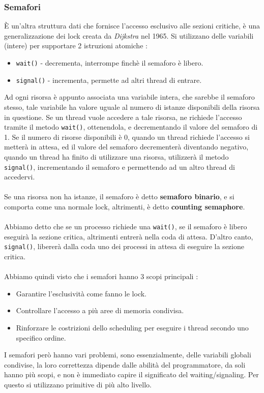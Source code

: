 \documentclass[12pt, letterpaper]{article}
\newcommand{\code}[1]{\colorbox{light-gray}{\texttt{#1}}}
\newcommand{\acc}{\\\hphantom{}\\}
\begin{document}
\subsubsection{Semafori}
È un'altra struttura dati che fornisce l'accesso esclusivo alle sezioni critiche, è una generalizzazione dei lock 
creata da \textit{Dijkstra} nel 1965. Si utilizzano delle variabili (intere) per supportare 2 
istruzioni atomiche :\begin{itemize}
    \item \code{wait()} - decrementa, interrompe finchè il semaforo è libero. 
    \item \code{signal()}  - incrementa, permette ad altri thread di entrare. 
\end{itemize}
Ad ogni risorsa è appunto associata una variabile intera, che sarebbe il semaforo stesso, tale variabile ha valore uguale al numero di 
istanze disponibili della risorsa in questione. Se un thread vuole accedere a tale risorsa, ne richiede l'accesso tramite il metodo 
\code{wait()}, ottenendola, e decrementando il valore del semaforo di 1. Se il numero di risorse disponibili è 0, quando un thread richiede 
l'accesso si metterà in attesa, ed il valore del semaforo decrementerà diventando negativo, quando un thread ha finito di utilizzare una risorsa, 
utilizzerà il metodo \code{signal()}, incrementando il semaforo e permettendo ad un altro thread di accedervi.  \acc 
Se una risorsa non ha istanze, il semaforo è detto \textbf{semaforo binario}, e si comporta come una normale lock, 
altrimenti, è detto \textbf{counting semaphore}.\acc 
Abbiamo detto che se un processo richiede una \code{wait()}, se il semaforo è libero eseguirà la sezione critica, altrimenti 
entrerà nella coda di attesa. D'altro canto, \code{signal()}, libererà dalla coda uno dei processi in attesa di 
eseguire la sezione critica.\acc 
Abbiamo quindi visto che i semafori hanno 3 scopi principali : \begin{itemize}
    \item Garantire l'esclusività come fanno le lock.
    \item Controllare l'accesso a più aree di memoria condivisa. 
    \item Rinforzare le costrizioni dello scheduling per eseguire i thread secondo uno specifico ordine.
\end{itemize}
I semafori però hanno vari problemi, sono essenzialmente, delle variabili globali condivise, la loro correttezza dipende 
dalle abilità del programmatore, da soli hanno più scopi, e non è immediato capire il significato del waiting\slash signaling.
Per questo si utilizzano primitive di più alto livello.
\end{document}
